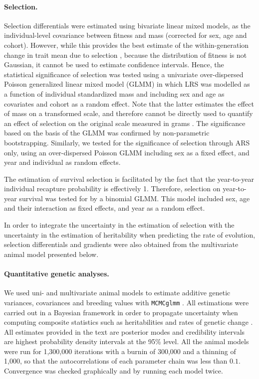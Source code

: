 \paragraph{Selection.}
Selection differentials were estimated using bivariate linear mixed models, as the individual-level covariance between fitness and mass (corrected for sex, age and cohort). However, while this provides the best estimate of the within-generation change in trait mean due to selection \parencite{Lande1983}, because the distribution of fitness is not Gaussian, it cannot be used to estimate confidence intervals. Hence, the statistical significance of selection was tested using a univariate over-dispersed Poisson generalized linear mixed model (GLMM) in which LRS was modelled as a function of individual standardized mass and including sex and age as covariates and cohort as a random effect. Note that the latter estimates the effect of mass on a transformed scale, and therefore cannot be directly used to quantify an effect of selection on the original scale measured in grams \parencite{Mitchell-Olds1987}. The significance based on the basis of the GLMM was confirmed by non-parametric bootstrapping. Similarly, we tested for the significance of selection through ARS only, using an over-dispersed Poisson GLMM including sex as a fixed effect, and year and individual as random effects. 

The estimation of survival selection is facilitated by the fact that the year-to-year individual recapture probability is effectively 1. Therefore, selection on year-to-year survival was tested for by a binomial GLMM. This model included sex, age and their interaction as fixed effects, and year as a random effect.

In order to integrate the uncertainty in the estimation of selection with the uncertainty in the estimation of heritability when predicting the rate of evolution, selection differentials and gradients were also obtained from the multivariate animal model presented below.

\paragraph{Quantitative genetic analyses.}
We used uni- and multivariate animal models to estimate additive genetic variances, covariances and breeding values \parencite{henderson1984,Lynch1998,Kruuk2004} with \verb+MCMCglmm+ \parencite{Hadfield2010a}. All estimations were carried out in a Bayesian framework in order to propagate uncertainty when computing composite statistics such as heritabilities and rates of genetic change \parencite{Stinchcombe2014}. All estimates provided in the text are posterior modes and credibility intervals are highest probability density intervals at the 95\% level.
All the animal models were run for 1,300,000 iterations with a burnin of 300,000 and a thinning of 1,000, so that the autocorrelations of each parameter chain was less than $0.1$. Convergence was checked graphically and by running each model twice.

